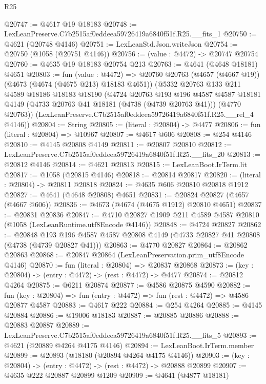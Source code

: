 \begin{lexlean}{R25}
\begin{coremodule}
@20747 := @4617 @19 @18183
@20748 := LexLeanPreserve.C7b2515af0eddeea59726419a6840f51f.R25.__fits_1
@20750 := @4621 (@20748 @4146)
@20751 := LexLeanStd.Json.writeJson
@20754 := @20750 (@1058 (@20751 @4146))
@20756 := (value : @4472) -> @20747 @20754
@20760 := @4635 @19 @18183 @20754 @213
@20763 := @4641 (@4648 @18181) @4651
@20803 := fun (value : @4472) =>
  @20760
    @20763
    (@4657 (@4667 @19))
    (@4673 (@4674 (@4675 @213) @18183 @4651))
    (@5332
      @20763
      @133
      @211
      @4589
      @18186
      @18183
      @18190
      (@4724
        @20763
        @193
        @196
        @4587
        @4587
        @18181
        @4149
        (@4733 @20763 @41 @18181 (@4738 (@4739 @20763 @41)))
        (@4770 @20763))
      (LexLeanPreserve.C7b2515af0eddeea59726419a6840f51f.R25.__rel_4 @4146))
@20804 := String
@20805 := (literal : @20804) -> @4477
@20806 := fun (literal : @20804) => @10967
@20807 := @4617 @606
@20808 := @254 @4146
@20810 := @4145 @20808 @4149
@20811 := @20807 @20810
@20812 := LexLeanPreserve.C7b2515af0eddeea59726419a6840f51f.R25.__fits_20
@20813 := @20812 @4146
@20814 := @4621 @20813
@20815 := LexLeanBoot.IrTerm.lit
@20817 := @1058 (@20815 @4146)
@20818 := @20814 @20817
@20820 := (literal : @20804) -> @20811 @20818
@20824 := @4635 @606 @20810 @20818 @1912
@20827 := @4641 (@4648 @20808) @4651
@20831 := @20824 @20827 (@4657 (@4667 @606))
@20836 := @4673 (@4674 (@4675 @1912) @20810 @4651)
@20837 := @20831 @20836
@20847 := @4710 @20827 @1909 @211 @4589 @4587 @20810 (@1058 (LexLeanRuntime.utf8Encode @4146))
@20848 := @4724 @20827
@20862 := @20848
    @193
    @196
    @4587
    @4587
    @20808
    @4149
    (@4733 @20827 @41 @20808 (@4738 (@4739 @20827 @41)))
@20863 := @4770 @20827
@20864 := @20862 @20863
@20868 := @20847 @20864 (LexLeanPreservation.prim_utf8Encode @4146)
@20870 := fun (literal : @20804) => @20837 @20868
@20873 := (key : @20804) -> (entry : @4472) -> (rest : @4472) -> @4477
@20874 := @20812 @4264
@20875 := @6211 @20874
@20877 := @4586 @20875 @4590
@20882 := fun (key : @20804) => fun (entry : @4472) => fun (rest : @4472) => @4586 @20877 @4587
@20883 := @4617 @222
@20884 := @254 @4264
@20885 := @4145 @20884
@20886 := @19006 @18183
@20887 := @20885 @20886
@20888 := @20883 @20887
@20889 := LexLeanPreserve.C7b2515af0eddeea59726419a6840f51f.R25.__fits_5
@20893 := @4621 (@20889 @4264 @4175 @4146)
@20894 := LexLeanBoot.IrTerm.member
@20899 := @20893 (@18180 (@20894 @4264 @4175 @4146))
@20903 := (key : @20804) -> (entry : @4472) -> (rest : @4472) -> @20888 @20899
@20907 := @4635 @222 @20887 @20899 @1209
@20909 := @4641 (@4877 @18181)

\end{coremodule}
\end{lexlean}
